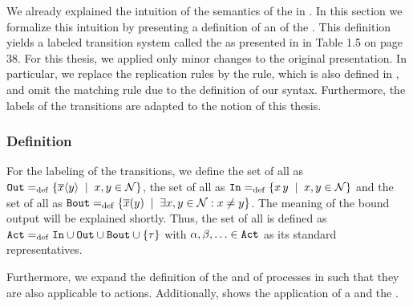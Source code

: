 We already explained the intuition of the semantics of the \picalc{} in . In this section we formalize this intuition by presenting a definition of an  of the \picalc{}. This definition yields a labeled transition system called the  as presented in \cite{sangiorgi} in Table 1.5 on page 38. For this thesis, we applied only minor changes to the original presentation. %
In particular, we replace the replication rules by the \ecall{} rule, which is also defined in \cite{sangiorgi}, and omit the matching rule due to the definition of our syntax. Furthermore, the labels of the transitions are adapted to the notion of this thesis.

\subsubsection{Definition}
For the labeling of the transitions, we define the set of all  as $\outA\define\set[x,y\in\names]{\out{x}{y}}$, the set of all  as $\inA\define\set[x,y\in\names]{\inpa{x}{y}}$ and the set of all  as $\boutA\define\set[\exists{}x,y\in\names:x\neq{}y]{\bout{x}{y}}$. The meaning of the bound output will be explained shortly. Thus, the set of all  is defined as $\actions\define\inA\cup\outA\cup\boutA\cup\set{\tau}$ with $\alpha,\beta,\ldots\in\mathtt{Act}$ as its standard representatives.

Furthermore, we expand the definition of the  and  of processes in  such that they are also applicable to actions. Additionally,  shows the application of a  and the .


